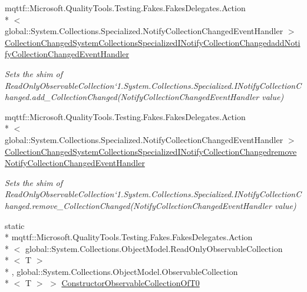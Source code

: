 \begin{DoxyCompactItemize}
mqttf\-::\-Microsoft.\-Quality\-Tools.\-Testing.\-Fakes.\-Fakes\-Delegates.\-Action\\*
$<$ global\-::\-System.\-Collections.\-Specialized.\-Notify\-Collection\-Changed\-Event\-Handler $>$ \hyperlink{class_system_1_1_collections_1_1_object_model_1_1_fakes_1_1_shim_read_only_observable_collection_3_01_t_01_4_a057e80867e8f8d6b960bdda4f6fcf854}{Collection\-Changed\-System\-Collections\-Specialized\-I\-Notify\-Collection\-Changedadd\-Notify\-Collection\-Changed\-Event\-Handler}
\begin{DoxyCompactList}\small\item\em Sets the shim of Read\-Only\-Observable\-Collection`1.System.\-Collections.\-Specialized.\-I\-Notify\-Collection\-Changed.\-add\-\_\-\-Collection\-Changed(\-Notify\-Collection\-Changed\-Event\-Handler value)\end{DoxyCompactList}\item 
mqttf\-::\-Microsoft.\-Quality\-Tools.\-Testing.\-Fakes.\-Fakes\-Delegates.\-Action\\*
$<$ global\-::\-System.\-Collections.\-Specialized.\-Notify\-Collection\-Changed\-Event\-Handler $>$ \hyperlink{class_system_1_1_collections_1_1_object_model_1_1_fakes_1_1_shim_read_only_observable_collection_3_01_t_01_4_a56ebfabd3912ac440b62b19cc29e6069}{Collection\-Changed\-System\-Collections\-Specialized\-I\-Notify\-Collection\-Changedremove\-Notify\-Collection\-Changed\-Event\-Handler}
\begin{DoxyCompactList}\small\item\em Sets the shim of Read\-Only\-Observable\-Collection`1.System.\-Collections.\-Specialized.\-I\-Notify\-Collection\-Changed.\-remove\-\_\-\-Collection\-Changed(\-Notify\-Collection\-Changed\-Event\-Handler value)\end{DoxyCompactList}\item 
static \\*
mqttf\-::\-Microsoft.\-Quality\-Tools.\-Testing.\-Fakes.\-Fakes\-Delegates.\-Action\\*
$<$ global\-::\-System.\-Collections.\-Object\-Model.\-Read\-Only\-Observable\-Collection\\*
$<$ T $>$\\*
, global\-::\-System.\-Collections.\-Object\-Model.\-Observable\-Collection\\*
$<$ T $>$ $>$ \hyperlink{class_system_1_1_collections_1_1_object_model_1_1_fakes_1_1_shim_read_only_observable_collection_3_01_t_01_4_a5f35c11e7d7b34b4cea1a44da9f3163a}{Constructor\-Observable\-Collection\-Of\-T0}

\end{DoxyCompactItemize}

